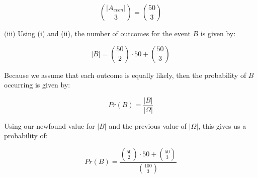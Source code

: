 \documentclass{article}
\newcommand{\subproblem}[1]{$\boxed{\text{(#1)}}$}
\newcommand{\solution}[1]{\boxed{#1}}
\begin{document}
\begin{multicols*}{2}
\[
\binom{|A_{even}|}{3}=\binom{50}{3}
\]

%
\subproblem{iii} Using (i) and (ii), the number of outcomes for the
event $B$ is given by:

\[
|B|=\binom{50}{2}\cdot 50 + \binom{50}{3}
\]

Because we assume that each outcome is equally likely, then the
probability of $B$ occurring is given by:

\[
Pr(B)=\frac{|B|}{|\Omega|}
\]

Using our newfound value for $|B|$ and the previous value of
$|\Omega|$, this gives us a probability of:

\[
\solution{Pr(B)=\dfrac{\binom{50}{2}\cdot50+\binom{50}{3}}{\binom{100}{3}}}
\]


\end{multicols*}
\end{document}
